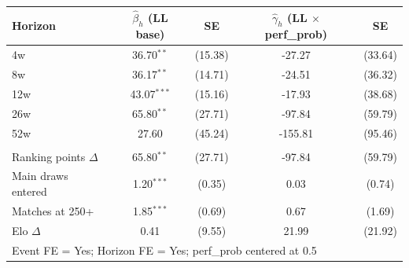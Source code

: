 \begin{tabular}{l c c c c}
\toprule
Horizon & $\hat{\beta}_h$ (LL base) & SE & $\hat{\gamma}_h$ (LL $\times$ perf\_prob) & SE \\
\midrule
4w & 36.70$^{**}$ & (15.38) & -27.27 & (33.64) \\
8w & 36.17$^{**}$ & (14.71) & -24.51 & (36.32) \\
12w & 43.07$^{***}$ & (15.16) & -17.93 & (38.68) \\
26w & 65.80$^{**}$ & (27.71) & -97.84 & (59.79) \\
52w & 27.60 & (45.24) & -155.81 & (95.46) \\
\addlinespace
\midrule
\multicolumn{5}{l}{\textit{All outcomes at 26w}} \\
Ranking points $\Delta$ & 65.80$^{**}$ & (27.71) & -97.84 & (59.79) \\
Main draws entered & 1.20$^{***}$ & (0.35) & 0.03 & (0.74) \\
Matches at 250+ & 1.85$^{***}$ & (0.69) & 0.67 & (1.69) \\
Elo $\Delta$ & 0.41 & (9.55) & 21.99 & (21.92) \\
\midrule
\multicolumn{5}{l}{Event FE = Yes; Horizon FE = Yes; perf\_prob centered at 0.5} \\
\bottomrule
\end{tabular}
